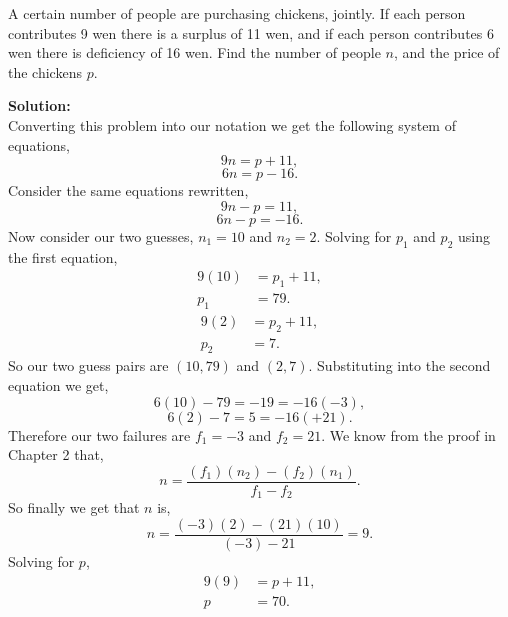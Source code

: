 \documentclass[12pt]{article}
\makeatletter
\theoremstyle{homework}
\newenvironment{exercise}[1]
{\def\@currentlabel{#1}\exercisecore}
{\endexercisecore}
\newcommand{\localhead}[1]{\par\smallskip\noindent\textbf{#1}\nobreak\\}%
\newcommand\solution{\localhead{Solution:}}
\makeatother
\begin{document}
  \begin{exercise}{16a} A certain number of people are purchasing chickens, jointly. If each person contributes 9 wen 
    there is a surplus of 11 wen, and if each person contributes 6 wen there is deficiency of 16 wen. Find the number of people $n$, 
    and the price of the chickens $p$.\\

    \solution Converting this problem into our notation we get the following system of equations, 
    \begin{equation*}
      9n = p + 11,
    \end{equation*}
    \begin{equation*}
      6n = p - 16.
    \end{equation*}
    Consider the same equations rewritten, 
    \begin{equation*}
      9n - p= 11,
    \end{equation*}
    \begin{equation*}
      6n - p = -16.
    \end{equation*}
    Now consider our two guesses, $n_1 = 10$ and $n_2 = 2$. Solving for $p_1$ and $p_2$ using the first equation,
    \begin{align*}
      9(10) &= p_1 + 11,\\
      p_1 &= 79.
    \end{align*} 
    \begin{align*}
      9(2) &= p_2 + 11,\\
      p_2 &= 7.
    \end{align*} 
    So our two guess pairs are $(10,79)$ and $(2,7)$. Substituting into the second equation we get, 
    \begin{equation*}
      6(10) - 79 = -19 = -16 (- 3),
    \end{equation*}
    \begin{equation*}
      6(2) - 7 = 5 = -16 (+ 21).
    \end{equation*}
    Therefore our two failures are $f_1 = -3$ and $f_2 = 21$. We know from the proof in Chapter 2 that, 
    \begin{equation*}
      n = \frac{(f_1)(n_2) - (f_2)(n_1)}{f_1 - f_2}.
    \end{equation*}
So finally we get that $n$ is, 
\begin{equation*}
  n = \frac{(-3)(2)-(21)(10)}{(-3) - 21} = 9.
\end{equation*}
Solving for $p$, 
\begin{align*}
  9(9) &= p + 11,\\
  p &= 70.
\end{align*}
\end{exercise}
\vspace{.5in}
\end{document}
